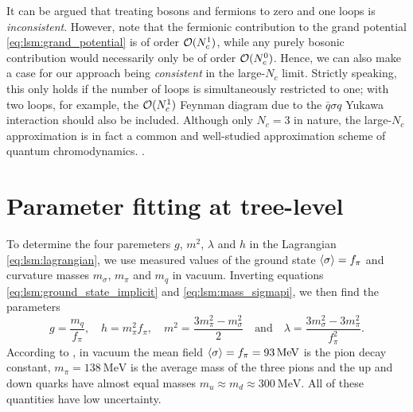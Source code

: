 It can be argued that treating bosons and fermions to zero and one loops is \emph{inconsistent}.
However, note that the fermionic contribution to the grand potential \eqref{eq:lsm:grand_potential} is of order $\mathcal{O}(N_c^1)$,
while any purely bosonic contribution would necessarily only be of order $\mathcal{O}(N_c^0)$.
Hence, we can also make a case for our approach being \emph{consistent} in the large-$N_c$ limit.
Strictly speaking, this only holds if the number of loops is simultaneously restricted to one;
with two loops, for example, the $\mathcal{O}(N_c^1)$ Feynman diagram due to the $\bar{q} \sigma q$ Yukawa interaction should also be included.
Although only $N_c = 3$ in nature,
the large-$N_c$ approximation is in fact a common and well-studied approximation scheme of quantum chromodynamics.
\cite{ref:large_Nc_review}.

\section{Parameter fitting at tree-level}
\label{sec:lsm:parameter_fit}

To determine the four paremeters $g$, $m^2$, $\lambda$ and $h$ in the Lagrangian \eqref{eq:lsm:lagrangian},
we use measured values of the ground state $\langle \sigma \rangle=f_\pi$ and curvature masses $m_\sigma$, $m_\pi$ and $m_q$ in vacuum.
Inverting equations \eqref{eq:lsm:ground_state_implicit} and \eqref{eq:lsm:mass_sigmapi}, we then find the parameters
\begin{equation}
	g       = \frac{m_q}{f_\pi}, \quad %
	h       = m_\pi^2 f_\pi, \quad %
	m^2     = \frac{3m_\pi^2 - m_\sigma^2}{2} \quad \text{and} \quad %
	\lambda = \frac{3 m_\sigma^2 - 3 m_\pi^2}{f_\pi^2} .    %
\label{eq:lsm:parameters}
\end{equation}
According to \cite{ref:pdg_review_2021}, in vacuum the mean field $\langle \sigma \rangle = f_\pi = \SI{93}{\mega\electronvolt}$ is the pion decay constant,
$m_\pi = \SI{138}{\mega\electronvolt}$ is the average mass of the three pions
and the up and down quarks have almost equal masses $m_u \approx m_d \approx \SI{300}{\mega\electronvolt}$.
All of these quantities have low uncertainty.


